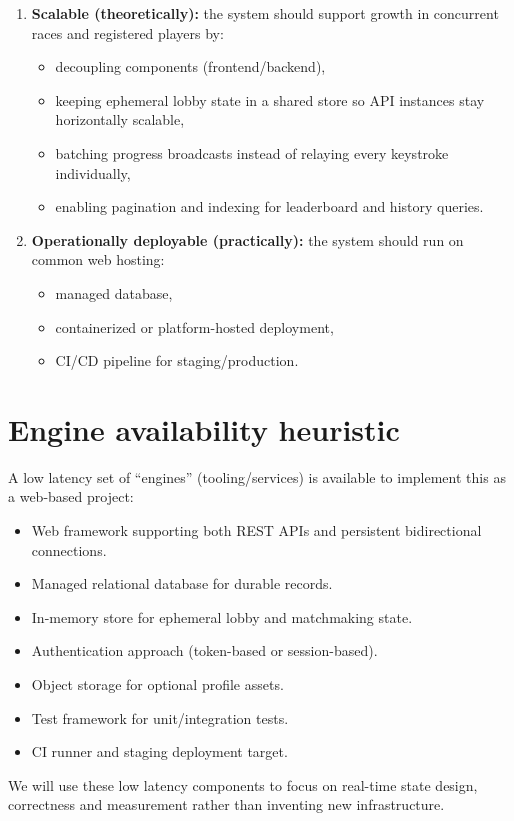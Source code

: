 \documentclass[11pt,a4paper]{article}
\begin{document}
\begin{enumerate}[leftmargin=0.7cm]
    \item \textbf{Scalable (theoretically):} the system should support growth in concurrent races and registered players by:
    \begin{itemize}[leftmargin=0.7cm]
        \item decoupling components (frontend/backend),
        \item keeping ephemeral lobby state in a shared store so API instances stay horizontally scalable,
        \item batching progress broadcasts instead of relaying every keystroke individually,
        \item enabling pagination and indexing for leaderboard and history queries.
    \end{itemize}

    \item \textbf{Operationally deployable (practically):} the system should run on common web hosting:
    \begin{itemize}[leftmargin=0.7cm]
        \item managed database,
        \item containerized or platform-hosted deployment,
        \item CI/CD pipeline for staging/production.
    \end{itemize}
\end{enumerate}

\section{Engine availability heuristic}
A low latency set of ``engines'' (tooling/services) is available
to implement this as a web-based project:
\begin{itemize}[leftmargin=0.7cm]
    \item Web framework supporting both REST APIs and persistent bidirectional connections.
    \item Managed relational database for durable records.
    \item In-memory store for ephemeral lobby and matchmaking state.
    \item Authentication approach (token-based or session-based).
    \item Object storage for optional profile assets.
    \item Test framework for unit/integration tests.
    \item CI runner and staging deployment target.
\end{itemize}
We will use these low latency components to focus on real-time
state design, correctness and measurement rather than inventing
new infrastructure.
\end{document}
